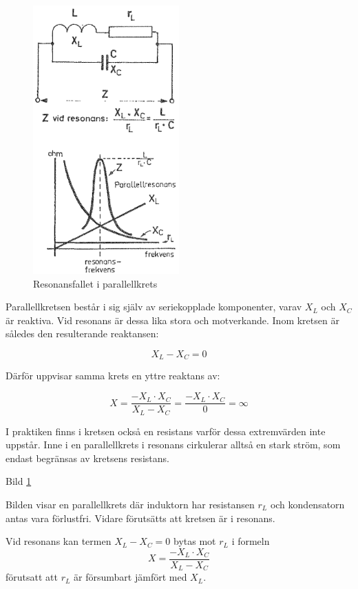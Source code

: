 \begin{figure}
\includegraphics[width=0.5\textwidth]{images/bild_2_3-18.png}
\caption{Resonansfallet i parallellkrets}
\label{fig:BildII3-18}
\end{figure}

Parallellkretsen består i sig själv av seriekopplade komponenter, varav
\(X_L\) och \(X_C\) är reaktiva. Vid resonans är dessa lika stora och
motverkande. Inom kretsen är således den resulterande reaktansen:

\[X_L - X_C = 0\]

Därför uppvisar samma krets en yttre reaktans av:

\[
  X = \frac{-X_L \cdot X_C}{X_L - X_C}
  = \frac{-X_L \cdot X_C}{0}
  = \infty
\]

I praktiken finns i kretsen också en resistans varför dessa extremvärden inte
uppstår. Inne i en parallellkrets i resonans cirkulerar alltså en stark ström,
som endast begränsas av kretsens resistans.

Bild \ref{fig:BildII3-18}

Bilden visar en parallellkrets där induktorn har resistansen \(r_L\) och
kondensatorn antas vara förlustfri. Vidare förutsätts att kretsen är i resonans.

Vid resonans kan termen \(X_L - X_C = 0\) bytas mot \(r_L\) i formeln
\[X = \frac{-X_L \cdot X_C}{X_L - X_C}\] förutsatt att \(r_L\) är försumbart
jämfört med \(X_L\).

